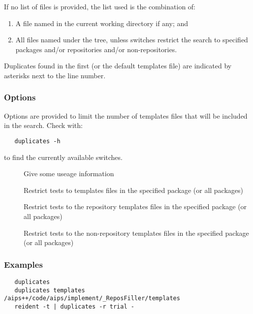 If no list of files is provided, the list used is the combination of:
\begin{enumerate}
        \item A file named  in the current working directory
              if any; and
        \item All files named  under the
              tree, unless switches restrict the search to
              specified packages and/or repositories and/or non-repositories.
\end{enumerate}

Duplicates found in the first (or the default templates file) are indicated
by asterisks next to the line number.

\subsubsection*{Options}

Options are provided to limit the number of templates files that will be
included in the search. Check with:

\begin{verbatim}
   duplicates -h
\end{verbatim}

to find the currently available switches.

\begin{description}
\item[]
    Give some useage information
\item[]
    Restrict tests to templates files in the specified package (or all
    packages)
\item[]
    Restrict tests to the repository templates files in the specified package
    (or all packages)
\item[]
    Restrict tests to the non-repository templates files in the specified package
    (or all packages)
\end{description}

\subsubsection*{Examples}

\begin{verbatim}
   duplicates
   duplicates templates /aips++/code/aips/implement/_ReposFiller/templates
   reident -t | duplicates -r trial - 
\end{verbatim}


